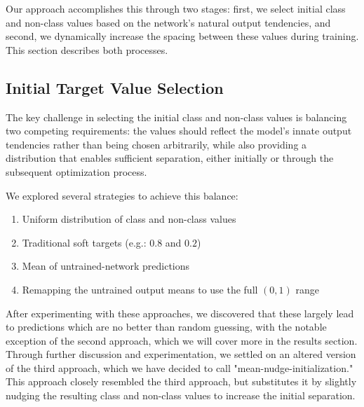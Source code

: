 \documentclass[12pt,fleqn,a4paper]{article}
\begin{document}
Our approach accomplishes this through two stages: first, we select initial class and non-class values based on the network's natural output tendencies, and second, we dynamically increase the spacing between these values during training. This section describes both processes.

\subsection{Initial Target Value Selection}
The key challenge in selecting the initial class and non-class values is balancing two competing requirements: the values should reflect the model's innate output tendencies rather than being chosen arbitrarily, while also providing a distribution that enables sufficient separation, either initially or through the subsequent optimization process.

We explored several strategies to achieve this balance:
\begin{enumerate}
    \item Uniform distribution of class and non-class values
    \item Traditional soft targets (e.g.: $0.8$ and $0.2$)
    \item Mean of untrained-network predictions
    \item Remapping the untrained output means to use the full $(0,1)$ range
\end{enumerate}

After experimenting with these approaches, we discovered that these largely lead to predictions which are no better than random guessing, with the notable exception of the second approach, which we will cover more in the results section. Through further discussion and experimentation, we settled on an altered version of the third approach, which we have decided to call "mean-nudge-initialization."
This approach closely resembled the third approach, but substitutes it by slightly nudging the resulting class and non-class values to increase the initial separation. 
\end{document}
